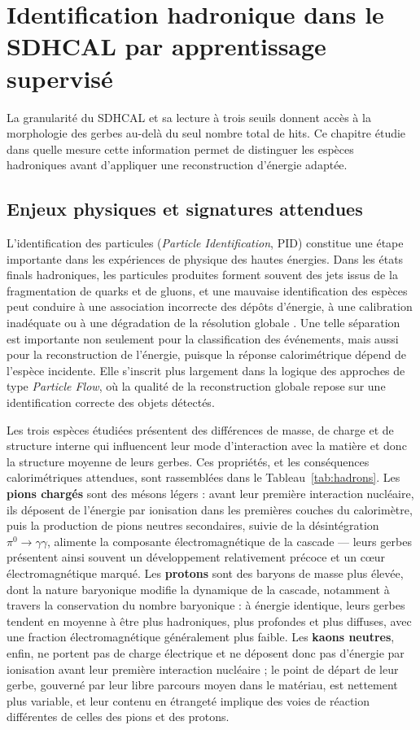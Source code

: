 \chapter{Identification hadronique dans le SDHCAL par apprentissage supervisé}
\label{sec:pid_mlp}

La granularité du SDHCAL et sa lecture à trois seuils donnent accès à la morphologie des gerbes au-delà du seul nombre total de hits. Ce chapitre étudie dans quelle mesure cette information permet de distinguer les espèces hadroniques avant d’appliquer une reconstruction d’énergie adaptée.

\section{Enjeux physiques et signatures attendues}
\label{sec:pid-enjeux}

L'identification des particules (\emph{Particle Identification}, PID) constitue une étape importante dans les expériences de physique des hautes énergies. Dans les états finals hadroniques, les particules produites forment souvent des jets issus de la fragmentation de quarks et de gluons, et une mauvaise identification des espèces peut conduire à une association incorrecte des dépôts d'énergie, à une calibration inadéquate ou à une dégradation de la résolution globale \cite{pdg2024}. Une telle séparation est importante non seulement pour la classification des événements, mais aussi pour la reconstruction de l'énergie, puisque la réponse calorimétrique dépend de l'espèce incidente. Elle s'inscrit plus largement dans la logique des approches de type \emph{Particle Flow}, où la qualité de la reconstruction globale repose sur une identification correcte des objets détectés.

Les trois espèces étudiées présentent des différences de masse, de charge et de structure interne qui influencent leur mode d'interaction avec la matière et donc la structure moyenne de leurs gerbes. Ces propriétés, et les conséquences calorimétriques attendues, sont rassemblées dans le Tableau~\ref{tab:hadrons}. Les \textbf{pions chargés} sont des mésons légers : avant leur première interaction nucléaire, ils déposent de l'énergie par ionisation dans les premières couches du calorimètre, puis la production de pions neutres secondaires, suivie de la désintégration $\pi^0 \to \gamma\gamma$, alimente la composante électromagnétique de la cascade — leurs gerbes présentent ainsi souvent un développement relativement précoce et un cœur électromagnétique marqué. Les \textbf{protons} sont des baryons de masse plus élevée, dont la nature baryonique modifie la dynamique de la cascade, notamment à travers la conservation du nombre baryonique : à énergie identique, leurs gerbes tendent en moyenne à être plus hadroniques, plus profondes et plus diffuses, avec une fraction électromagnétique généralement plus faible. Les \textbf{kaons neutres}, enfin, ne portent pas de charge électrique et ne déposent donc pas d'énergie par ionisation avant leur première interaction nucléaire ; le point de départ de leur gerbe, gouverné par leur libre parcours moyen dans le matériau, est nettement plus variable, et leur contenu en étrangeté implique des voies de réaction différentes de celles des pions et des protons.


